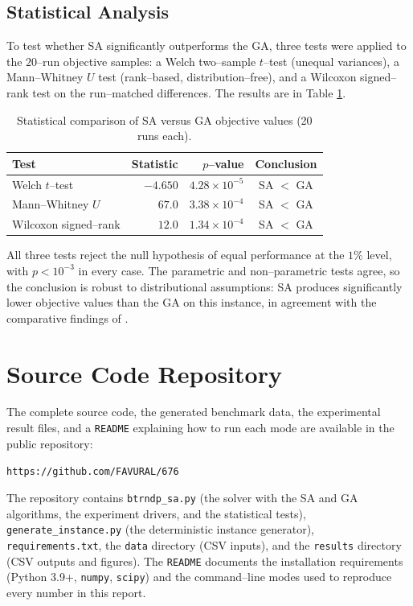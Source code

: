 \documentclass [a4paper, 11pt, titlepage] {article}
\begin{document}
\subsection{Statistical Analysis}
To test whether SA significantly outperforms the GA, three tests were applied to
the $20$--run objective samples: a Welch two--sample $t$--test (unequal
variances), a Mann--Whitney $U$ test (rank--based, distribution--free), and a
Wilcoxon signed--rank test on the run--matched differences. The results are in
Table \ref{tab:stats}.

\begin{table}[!htb]
  \centering
  \begin{tabular}{|l|r|r|c|}
    \hline
    Test & Statistic & $p$--value & Conclusion \\
    \hline
    Welch $t$--test       & $-4.650$ & $4.28 \times 10^{-5}$ & SA $<$ GA \\
    Mann--Whitney $U$     & $67.0$   & $3.38 \times 10^{-4}$ & SA $<$ GA \\
    Wilcoxon signed--rank & $12.0$   & $1.34 \times 10^{-4}$ & SA $<$ GA \\
    \hline
  \end{tabular}
  \caption{Statistical comparison of SA versus GA objective values (20 runs each).}
  \label{tab:stats}
\end{table}

All three tests reject the null hypothesis of equal performance at the
$1\%$ level, with $p < 10^{-3}$ in every case. The parametric and non--parametric
tests agree, so the conclusion is robust to distributional assumptions: SA
produces significantly lower objective values than the GA on this instance, in
agreement with the comparative findings of \cite{fan2006}.

\section{Source Code Repository}
\label{sec:repo}

The complete source code, the generated benchmark data, the experimental result
files, and a \texttt{README} explaining how to run each mode are available in the
public repository:
\begin{center}
\texttt{https://github.com/FAVURAL/676}
\end{center}
The repository contains \texttt{btrndp\_sa.py} (the solver with the SA and GA
algorithms, the experiment drivers, and the statistical tests),
\texttt{generate\_instance.py} (the deterministic instance generator),
\texttt{requirements.txt}, the \texttt{data} directory (CSV inputs), and the
\texttt{results} directory (CSV outputs and figures). The \texttt{README}
documents the installation requirements (Python 3.9+, \texttt{numpy},
\texttt{scipy}) and the command--line modes used to reproduce every number in
this report.
\end{document}
